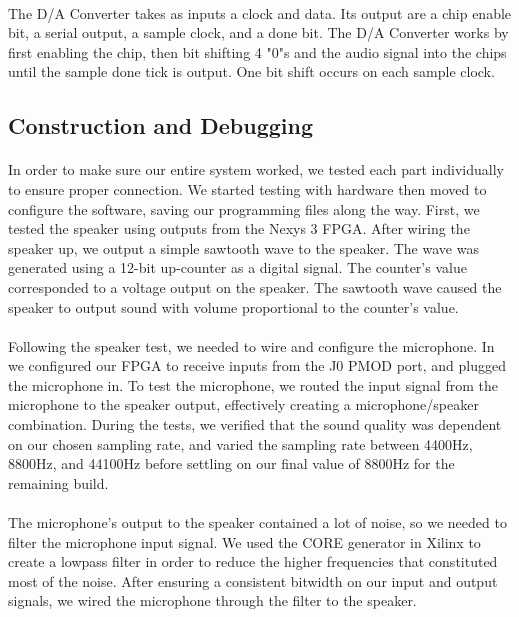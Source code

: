 \documentclass[12pt]{article}
\begin{document}
\paragraph{}
The D/A Converter takes as inputs a clock and data. Its output are a chip enable bit, a serial output, a sample clock, and a done bit. The D/A Converter works by first enabling the chip, then bit shifting 4 "0"s and the audio signal into the chips until the sample done tick is output. One bit shift occurs on each sample clock.


\subsection{Construction and Debugging}
\paragraph{}
In order to make sure our entire system worked, we tested each part individually to ensure proper connection. We started testing with hardware then moved to configure the software, saving our programming files along the way. First, we tested the speaker using outputs from the Nexys 3 FPGA. After wiring the speaker up, we output a simple sawtooth wave to the speaker. The wave was generated using a 12-bit up-counter as a digital signal. The counter's value corresponded to a voltage output on the speaker. The sawtooth wave caused the speaker to output sound with volume proportional to the counter's value. 
\paragraph{}
Following the speaker test, we needed to wire and configure the microphone. In we configured our FPGA to receive inputs from the J0 PMOD port, and plugged the microphone in. To test the microphone, we routed the input signal from the microphone to the speaker output, effectively creating a microphone/speaker combination. During the tests, we verified that the sound quality was dependent on our chosen sampling rate, and varied the sampling rate between 4400Hz, 8800Hz, and 44100Hz before settling on our final value of 8800Hz for the remaining build.
\paragraph{}
The microphone's output to the speaker contained a lot of noise, so we needed to filter the microphone input signal. We used the CORE generator in Xilinx to create a lowpass filter in order to reduce the higher frequencies that constituted most of the noise. After ensuring a consistent bitwidth on our input and output signals, we wired the microphone through the filter to the speaker. 
\end{document}
